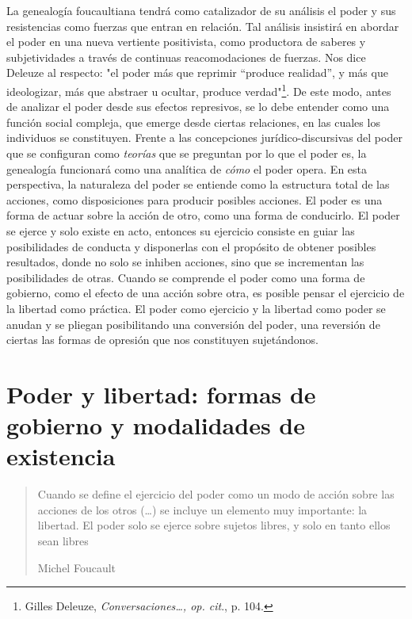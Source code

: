 \documentclass{book}
\begin{document}
La genealogía foucaultiana tendrá como catalizador de su análisis el
poder y sus resistencias como fuerzas que entran en relación. Tal
análisis insistirá en abordar el poder en una nueva vertiente
positivista, como productora de saberes y subjetividades a través de
continuas reacomodaciones de fuerzas. Nos dice Deleuze al respecto: "el
poder más que reprimir ``produce realidad'', y más que ideologizar, más
que abstraer u ocultar, produce verdad"\footnote{Gilles Deleuze,
  \emph{Conversaciones\ldots, op. cit}., p. 104.}. De este modo, antes
de analizar el poder desde sus efectos represivos, se lo debe entender
como una función social compleja, que emerge desde ciertas relaciones,
en las cuales los individuos se constituyen. Frente a las concepciones
jurídico-discursivas del poder que se configuran como \emph{teorías} que
se preguntan por lo que el poder es, la genealogía funcionará como una
analítica de \emph{cómo} el poder opera. En esta perspectiva, la
naturaleza del poder se entiende como la estructura total de las
acciones, como disposiciones para producir posibles acciones. El poder
es una forma de actuar sobre la acción de otro, como una forma de
conducirlo. El poder se ejerce y solo existe en acto, entonces su
ejercicio consiste en guiar las posibilidades de conducta y disponerlas
con el propósito de obtener posibles resultados, donde no solo se
inhiben acciones, sino que se incrementan las posibilidades de otras.
Cuando se comprende el poder como una forma de gobierno, como el efecto
de una acción sobre otra, es posible pensar el ejercicio de la libertad
como práctica. El poder como ejercicio y la libertad como poder se
anudan y se pliegan posibilitando una conversión del poder, una
reversión de ciertas las formas de opresión que nos constituyen
sujetándonos.

\section{Poder y libertad: formas de gobierno y modalidades de existencia}

\begin{quote}
Cuando se define el ejercicio del poder como un modo de acción sobre las
acciones de los otros (\dots) se incluye un elemento muy
importante: la libertad. El poder solo se ejerce sobre sujetos libres, y
solo en tanto ellos sean libres

Michel Foucault
\end{quote}
\end{document}

